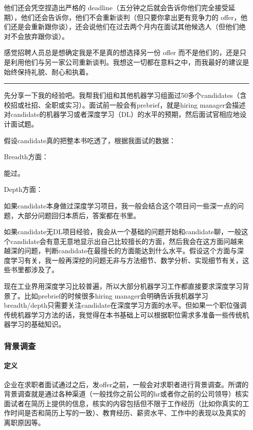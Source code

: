 \documentclass[letterpaper,11pt,english]{sphinxmanual}
\begin{document}
他们还会凭空捏造出严格的
deadline（五分钟之后就会告诉你他们完全接受延期），他们还会告诉你，他们不会重新谈判（但只要你拿出更有竞争力的
offer，他们还是会重新跟你谈），还会说他们在过去两个月内在面试其他候选人（但他们绝对不会放弃跟你谈）。

感觉招聘人员总是想确定我是不是真的想选择另一份 offer
而不是他们的，还是只是利用他们与另一家公司重新谈判。我想这一切都在意料之中，而我最好的建议是始终保持礼貌、耐心和执着。


\bigskip\hrule\bigskip


先分享一下我的经验吧。我帮我们组和其他机器学习组面过50多个candidates（含校招或社招、全职或实习）。面试前一般会有prebrief，就是hiring
manager会描述对candidate的机器学习或者深度学习（DL）的水平的预期，然后面试官相应地设计面试题。

假设candidate真的把整本书吃透了，根据我面试的数据：

Breadth方面：

能过。

Depth方面：

如果candidate本身做过深度学习项目，我一般会结合这个项目问一些深一点的问题，大部分问题回归本质后，答案都在书里。

如果candidate无DL项目经验，我会从一个基础的问题开始和candidate聊，一般这个candidate会有意无意地显示出自己比较擅长的方面，然后我会在这方面问越来越深的问题，判断candidate在最擅长的方面能达到什么水平。假设这个方面与深度学习有关，我一般再深挖的问题无非与方法细节、数学分析、实现细节有关，这些书里都涉及了。

现在工业界用深度学习比较普遍，所以大部分机器学习工作都直接要求深度学习背景了。比如prebrief的时候很多hiring
manager会明确告诉我机器学习breadth/depth只需要关注candidate在深度学习方面的水平。但如果一个职位强调传统机器学习方法的话，我觉得在本书基础上可以根据职位需求多准备一些传统机器学习的基础知识。


\subsubsection{背景调查}
\label{\detokenize{chapter_interview/background_survey:id1}}\label{\detokenize{chapter_interview/background_survey::doc}}

\paragraph{定义}
\label{\detokenize{chapter_interview/background_survey:id2}}
企业在求职者面试通过之后，发offer之前，一般会对求职者进行背景调查。所谓的背景调查就是通过各种渠道（一般找你之前公司的hr或者你之前的公司领导）核实面试者在简历上提供的信息，核实的内容包括但不限于工作经历（比如你真实的工作时间是否和简历上写的一致）、教育经历、薪资水平、工作中的表现以及真实的离职原因等。
\end{document}

